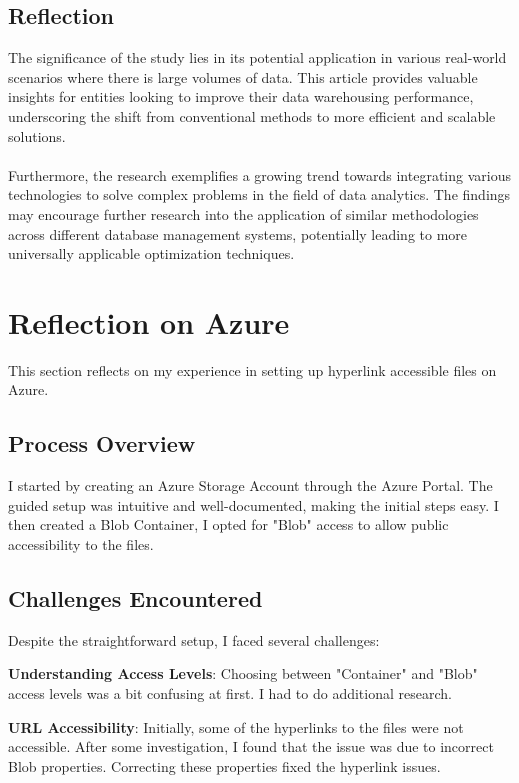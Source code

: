 \documentclass[10pt]{article}
\begin{document}
\subsection{Reflection}
The significance of the study lies in its potential application in various
real-world scenarios where there is large volumes of data. This article provides
valuable insights for entities looking to improve their data warehousing
performance, underscoring the shift from conventional methods to more efficient
and scalable solutions.
\\ \\
Furthermore, the research exemplifies a growing trend towards integrating
various technologies to solve complex problems in the field of data analytics.
The findings may encourage further research into the application of similar
methodologies across different database management systems, potentially leading
to more universally applicable optimization techniques.

	{\newpage}

\section{Reflection on Azure}
This section reflects on my experience in setting up hyperlink accessible files
on Azure.

\vspace*{0.5cm}

\subsection{Process Overview}
I started by creating an Azure Storage Account through the Azure Portal. The
guided setup was intuitive and well-documented, making the initial steps easy. I
then created a Blob Container,  I opted for "Blob" access to allow public
accessibility to the files.

\vspace*{0.5cm}

\subsection{Challenges Encountered}
Despite the straightforward setup, I faced several challenges:
\begin{description}[leftmargin=!,labelwidth=0pt,itemindent=0pt]
	\item[] \textbf{Understanding Access Levels}: Choosing between "Container"
	      and "Blob" access levels was a bit confusing at first. I had to do
	      additional research.
	\item[] \textbf{URL Accessibility}: Initially, some of the hyperlinks to the
	      files were not accessible. After some investigation, I found that
	      the issue was due to incorrect Blob properties. Correcting these properties
	      fixed the hyperlink issues.
\end{description}
\end{document}
